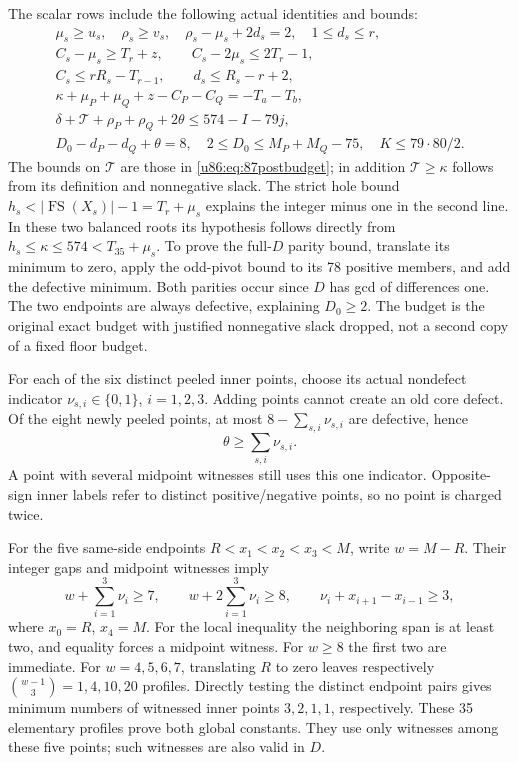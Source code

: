 \documentclass[11pt,a4paper]{article}
\theoremstyle{remark}
\newcommand{\FS}{\operatorname{FS}}
\begin{document}
The scalar rows include the following actual identities and bounds:
\begin{gather*}
 \mu_s\ge u_s,\quad \rho_s\ge v_s,\quad
 \rho_s-\mu_s+2d_s=2,\quad 1\le d_s\le r,\\
 C_s-\mu_s\ge T_r+z,\qquad
 C_s-2\mu_s\le2T_r-1,\\
 C_s\le rR_s-T_{r-1},\qquad d_s\le R_s-r+2,\\
 \kappa+\mu_P+\mu_Q+z-C_P-C_Q=-T_a-T_b,\\
 \delta+\mathcal T+\rho_P+\rho_Q+2\theta
 \le574-I-79j,\\
 D_0-d_P-d_Q+\theta=8,\quad
 2\le D_0\le M_P+M_Q-75,\quad K\le79\cdot80/2.
\end{gather*}
The bounds on $\mathcal T$ are those in \eqref{u86:eq:87postbudget};
in addition $\mathcal T\ge\kappa$ follows from its definition and
nonnegative slack. The strict hole bound
$h_s<|\FS(X_s)|-1=T_r+\mu_s$ explains the integer minus one in the
second line. In these two balanced roots its hypothesis follows directly
from $h_s\le\kappa\le574<T_{35}+\mu_s$. To prove the full-$D$ parity bound, translate its minimum
to zero, apply the odd-pivot bound to its 78 positive members, and add
the defective minimum. Both parities occur since $D$ has gcd of
differences one. The two endpoints are always defective, explaining
$D_0\ge2$. The budget is the original exact budget with justified
nonnegative slack dropped, not a second copy of a fixed floor budget.

For each of the six distinct peeled inner points, choose its actual
nondefect indicator $\nu_{s,i}\in\{0,1\}$, $i=1,2,3$.
Adding points cannot create an old core defect. Of the eight newly
peeled points, at most $8-\sum_{s,i}\nu_{s,i}$ are defective, hence
\[
 \theta\ge\sum_{s,i}\nu_{s,i}.
\]
A point with several midpoint witnesses still uses this one indicator.
Opposite-sign inner labels refer to distinct positive/negative points,
so no point is charged twice.

For the five same-side endpoints $R<x_1<x_2<x_3<M$, write $w=M-R$.
Their integer gaps and midpoint witnesses imply
\begin{equation}\label{u86:eq:87nf}
 w+\sum_{i=1}^3\nu_i\ge7,\qquad
 w+2\sum_{i=1}^3\nu_i\ge8,\qquad
 \nu_i+x_{i+1}-x_{i-1}\ge3,
\end{equation}
where $x_0=R$, $x_4=M$. For the local inequality the neighboring
span is at least two, and equality forces a midpoint witness.
For $w\ge8$ the first two are immediate. For $w=4,5,6,7$, translating
$R$ to zero leaves respectively $\binom{w-1}{3}=1,4,10,20$ profiles.
Directly testing the distinct endpoint pairs gives minimum numbers of
witnessed inner points $3,2,1,1$, respectively. These 35 elementary
profiles prove both global constants. They use only witnesses among
these five points; such witnesses are also valid in $D$.
\end{document}
